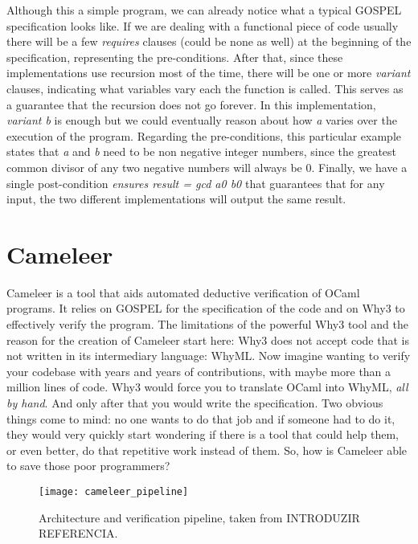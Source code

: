Although this a simple program, we can already notice what a typical GOSPEL specification looks like.
If we are dealing with a functional piece of code usually there will be a few \emph{requires} clauses (could be none as well) at the beginning of the specification, representing the pre-conditions.
After that, since these implementations use recursion most of the time, there will be one or more \emph{variant} clauses, indicating what variables vary each the function is called.
This serves as a guarantee that the recursion does not go forever.
In this implementation, \emph{variant b} is enough but we could eventually reason about how \emph{a} varies over the execution of the program. 
Regarding the pre-conditions, this particular example states that \emph{a} and \emph{b} need to be non negative integer numbers, since the greatest common divisor of any two negative numbers will always be 0.
Finally, we have a single post-condition \emph{ensures result = gcd a0 b0} that guarantees that for any input, the two different implementations will output the same result. 


\section{Cameleer}
\label{sec:cameleer}

Cameleer is a tool that aids automated deductive verification of OCaml programs.
It relies on GOSPEL for the specification of the code and on Why3 to effectively verify the program.
The limitations of the powerful Why3 tool and the reason for the creation of Cameleer start here: Why3 does not accept code that is not written in its intermediary language: WhyML.
Now imagine wanting to verify your codebase with years and years of contributions, with maybe more than a million lines of code.
Why3 would force you to translate OCaml into WhyML, \emph{all by hand}. 
And only after that you would write the specification.
Two obvious things come to mind: no one wants to do that job and if someone had to do it, they would very quickly start wondering if there is a tool that could help them, or even better, do that repetitive work instead of them.
So, how is Cameleer able to save those poor programmers?

\begin{figure}[htbp]
  \centering
  \texttt{[image: cameleer\_pipeline]}
  \caption{Architecture and verification pipeline, taken from INTRODUZIR REFERENCIA.}
  \label{fig:cameleer_pipeline}
\end{figure}

